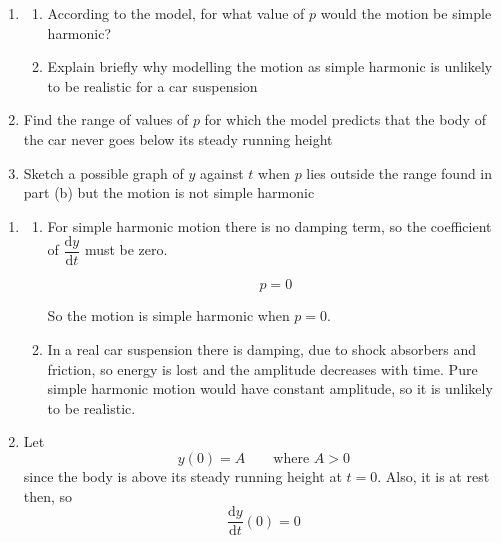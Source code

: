\documentclass[leqno]{article}
\begin{document}
\begin{enumerate}[
  label=\textbf{\arabic*.},
  leftmargin=*,
  topsep=0pt,
  partopsep=0pt,
  parsep=0pt
]
\begin{enumerate}[label=\textbf{(\alph*)}]
  \item
  \begin{enumerate}[label=(\roman*)]
    \item According to the model, for what value of $p$ would the motion be simple harmonic? 
    \item Explain briefly why modelling the motion as simple harmonic is unlikely to be realistic for a car suspension  \\
  \end{enumerate}
  \item Find the range of values of $p$ for which the model predicts that the body of the car never goes below its steady running height  \\
  \item Sketch a possible graph of $y$ against $t$ when $p$ lies outside the range found in part (b) but the motion is not simple harmonic  \\
\end{enumerate}

\vspace*{30pt}

\begin{tcolorbox}[colback=white, colframe=scarlet, title={\textbf{Solution}}, breakable, grow to left by=6mm, grow to right by=10mm]
\begin{enumerate}[label=\textbf{(\alph*)}]
  \item
  \begin{enumerate}[label=(\roman*)]
    \item For simple harmonic motion there is no damping term, so the coefficient of $\dfrac{\mathrm{d}y}{\mathrm{d}t}$ must be zero.

    \[
    p=0
    \]

    So the motion is simple harmonic when $p=0$.

    \item In a real car suspension there is damping, due to shock absorbers and friction, so energy is lost and the amplitude decreases with time. Pure simple harmonic motion would have constant amplitude, so it is unlikely to be realistic.
  \end{enumerate}

  \item Let
  \[
  y(0)=A \qquad \text{where } A>0
  \]
  since the body is above its steady running height at $t=0$. Also, it is at rest then, so
  \[
  \frac{\mathrm{d}y}{\mathrm{d}t}(0)=0
  \]


\end{enumerate}
\end{tcolorbox}
\end{enumerate}
\end{document}
